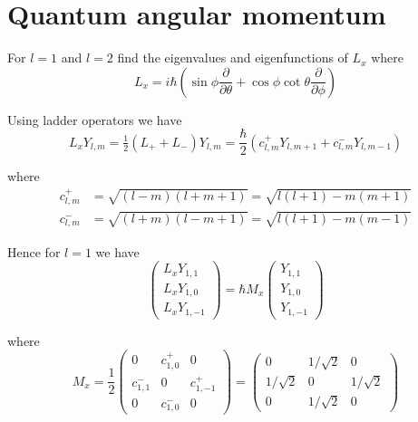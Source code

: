 

\section*{Quantum angular momentum}

For $l=1$ and $l=2$
find the eigenvalues and eigenfunctions of $L_x$ where
\begin{equation*}
L_x=i\hbar\left(
\sin\phi\frac{\partial}{\partial\theta}+\cos\phi\cot\theta\frac{\partial}{\partial\phi}
\right)
\end{equation*}

Using ladder operators we have
\begin{equation*}
L_xY_{l,m}=\tfrac{1}{2}(L_++L_-)Y_{l,m}
=\frac{\hbar}{2}\left(c_{l,m}^+Y_{l,m+1}+c_{l,m}^-Y_{l,m-1}\right)
\end{equation*}

where
\begin{align*}
c_{l,m}^+&=\sqrt{(l-m)(l+m+1)}=\sqrt{l(l+1)-m(m+1)}
\\
c_{l,m}^-&=\sqrt{(l+m)(l-m+1)}=\sqrt{l(l+1)-m(m-1)}
\end{align*}

Hence for $l=1$ we have
\begin{equation*}
\begin{pmatrix}L_xY_{1,1}\\L_xY_{1,0}\\L_xY_{1,-1}\end{pmatrix}
=
\hbar M_x\begin{pmatrix}Y_{1,1}\\Y_{1,0}\\Y_{1,-1}\end{pmatrix}
\end{equation*}

where
\begin{equation*}
M_x=\frac{1}{2}\begin{pmatrix}
0 & c_{1,0}^+ & 0
\\[1ex]
c_{1,1}^- & 0 & c_{1,-1}^+
\\[1ex]
0 & c_{1,0}^- & 0
\end{pmatrix}
=
\begin{pmatrix}
0 & 1/\sqrt2 & 0
\\[1ex]
1/\sqrt2 & 0 & 1/\sqrt2
\\[1ex]
0 & 1/\sqrt2 & 0
\end{pmatrix}
\end{equation*}

